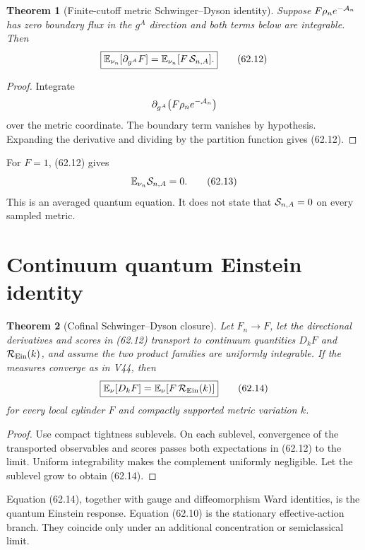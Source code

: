 \documentclass[11pt]{article}
\newtheorem{theorem}{Theorem}[section]
\theoremstyle{remark}
\begin{document}
\begin{theorem}[Finite-cutoff metric Schwinger--Dyson identity]
\label{thm:v15v62-sd}
Suppose \(F\rho_ne^{-{\cal A}_n}\) has zero boundary flux in the
\(g^A\) direction and both terms below are integrable.  Then
\[
 \boxed{
 \mathbb E_{\nu_n}[\partial_{g^A}F]
 =
 \mathbb E_{\nu_n}[F\,{\cal S}_{n,A}].}                 \tag{62.12}
\]
\end{theorem}

\begin{proof}
Integrate
\[
 \partial_{g^A}
 \bigl(F\rho_ne^{-{\cal A}_n}\bigr)
\]
over the metric coordinate.  The boundary term vanishes by
hypothesis.  Expanding the derivative and dividing by the partition
function gives (62.12).
\end{proof}

For \(F=1\), (62.12) gives
\[
 \mathbb E_{\nu_n}{\cal S}_{n,A}=0.                     \tag{62.13}
\]
This is an averaged quantum equation.  It does not state that
\({\cal S}_{n,A}=0\) on every sampled metric.

\section{Continuum quantum Einstein identity}

\begin{theorem}[Cofinal Schwinger--Dyson closure]
\label{thm:v15v62-sd-limit}
Let \(F_n\to F\), let the directional derivatives and scores in
(62.12) transport to continuum quantities
\(D_kF\) and \({\cal R}_{\rm Ein}(k)\), and assume the two product
families are uniformly integrable.  If the measures converge as in
V44, then
\[
 \boxed{
 \mathbb E_\nu[D_kF]
 =
 \mathbb E_\nu[F\,{\cal R}_{\rm Ein}(k)]}               \tag{62.14}
\]
for every local cylinder \(F\) and compactly supported metric
variation \(k\).
\end{theorem}

\begin{proof}
Use compact tightness sublevels.  On each sublevel, convergence of
the transported observables and scores passes both expectations in
(62.12) to the limit.  Uniform integrability makes the complement
uniformly negligible.  Let the sublevel grow to obtain (62.14).
\end{proof}

Equation (62.14), together with gauge and diffeomorphism Ward
identities, is the quantum Einstein response.  Equation (62.10) is
the stationary effective-action branch.  They coincide only under
an additional concentration or semiclassical limit.
\end{document}
